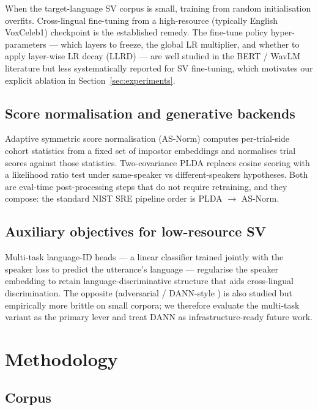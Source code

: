 \documentclass[11pt,a4paper]{article}
\begin{document}
When the target-language SV corpus is small, training from random
initialisation overfits. Cross-lingual fine-tuning from a
high-resource (typically English VoxCeleb1) checkpoint is the
established remedy. The fine-tune policy hyper-parameters — which
layers to freeze, the global LR multiplier, and whether to apply
layer-wise LR decay (LLRD) — are well studied in the BERT / WavLM
literature but less systematically reported for SV fine-tuning, which
motivates our explicit ablation in Section~\ref{sec:experiments}.

\subsection{Score normalisation and generative backends}
\label{sec:related:scoring}

Adaptive symmetric score normalisation (AS-Norm)
\cite{matejka2017analysis} computes per-trial-side cohort statistics
from a fixed set of impostor embeddings and normalises trial scores
against those statistics. Two-covariance PLDA
\cite{sizov2014unifying} replaces cosine scoring with a likelihood
ratio test under same-speaker vs different-speakers hypotheses. Both
are eval-time post-processing steps that do not require retraining,
and they compose: the standard NIST SRE pipeline order is
PLDA $\to$ AS-Norm.

\subsection{Auxiliary objectives for low-resource SV}
\label{sec:related:aux}

Multi-task language-ID heads — a linear classifier trained jointly
with the speaker loss to predict the utterance's language — regularise
the speaker embedding to retain language-discriminative structure
that aids cross-lingual discrimination. The opposite
(adversarial / DANN-style \cite{ganin2015dann}) is also studied but
empirically more brittle on small corpora; we therefore evaluate the
multi-task variant as the primary lever and treat DANN as
infrastructure-ready future work.

\section{Methodology}
\label{sec:method}

\subsection{Corpus}
\label{sec:method:corpus}
\end{document}
